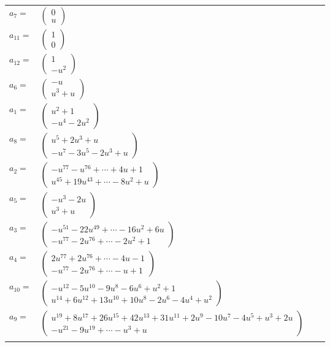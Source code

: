 \documentclass[1p]{elsarticle_modified}
\theoremstyle{definition}
\begin{document}
\begin{tabular}{m{7pt} m{180pt} m{7pt} m{180pt} }
\flushright $a_{7}=$&$\begin{pmatrix}0\\u\end{pmatrix}$ \\
\flushright $a_{11}=$&$\begin{pmatrix}1\\0\end{pmatrix}$ \\
\flushright $a_{12}=$&$\begin{pmatrix}1\\- u^2\end{pmatrix}$ \\
\flushright $a_{6}=$&$\begin{pmatrix}- u\\u^3+u\end{pmatrix}$ \\
\flushright $a_{1}=$&$\begin{pmatrix}u^2+1\\- u^4-2 u^2\end{pmatrix}$ \\
\flushright $a_{8}=$&$\begin{pmatrix}u^5+2 u^3+u\\- u^7-3 u^5-2 u^3+u\end{pmatrix}$ \\
\flushright $a_{2}=$&$\begin{pmatrix}- u^{77}- u^{76}+\cdots+4 u+1\\u^{45}+19 u^{43}+\cdots-8 u^2+u\end{pmatrix}$ \\
\flushright $a_{5}=$&$\begin{pmatrix}- u^3-2 u\\u^3+u\end{pmatrix}$ \\
\flushright $a_{3}=$&$\begin{pmatrix}- u^{51}-22 u^{49}+\cdots-16 u^2+6 u\\- u^{77}-2 u^{76}+\cdots-2 u^2+1\end{pmatrix}$ \\
\flushright $a_{4}=$&$\begin{pmatrix}2 u^{77}+2 u^{76}+\cdots-4 u-1\\- u^{77}-2 u^{76}+\cdots- u+1\end{pmatrix}$ \\
\flushright $a_{10}=$&$\begin{pmatrix}- u^{12}-5 u^{10}-9 u^8-6 u^6+u^2+1\\u^{14}+6 u^{12}+13 u^{10}+10 u^8-2 u^6-4 u^4+u^2\end{pmatrix}$ \\
\flushright $a_{9}=$&$\begin{pmatrix}u^{19}+8 u^{17}+26 u^{15}+42 u^{13}+31 u^{11}+2 u^9-10 u^7-4 u^5+u^3+2 u\\- u^{21}-9 u^{19}+\cdots- u^3+u\end{pmatrix}$\\&\end{tabular}
\end{document}
